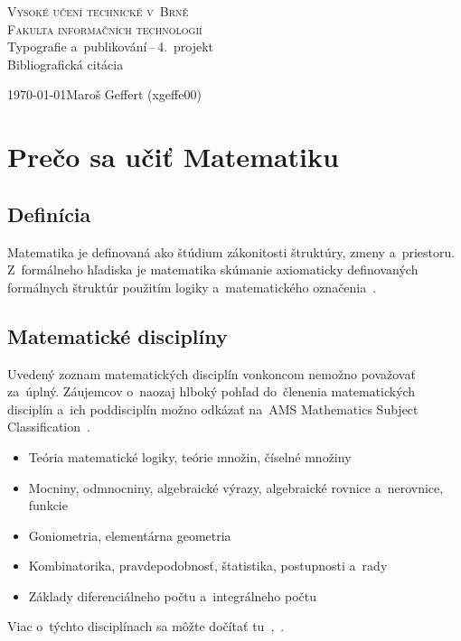 \documentclass[a4paper, 11pt]{article}
\begin{document}
    \begin{titlepage}
        \begin{center}
            {\Huge \textsc{Vysoké učení technické v~Brně}} \\
            {\huge \textsc
                {Fakulta informačních technologií}}\\
            
            \LARGE
            {Typografie a~publikování\,--\,4.~projekt} \\
            \Huge{
            Bibliografická citácia}\\
        \end{center}
    
        {\Large {\today \hfill Maroš Geffert (xgeffe00)}}
    \end{titlepage}

\section{Prečo sa učiť Matematiku}

\subsection{Definícia}
Matematika je definovaná ako štúdium zákonitosti štruktúry, zmeny a~priestoru. Z~formálneho hľadiska je matematika skúmanie axiomaticky definovaných formálnych štruktúr použitím logiky a~matematického označenia~\cite{kuvrina2011matematika}.

\subsection{Matematické disciplíny}
Uvedený zoznam matematických disciplín vonkoncom nemožno považovať za~úplný. Záujemcov o~naozaj hlboký pohľad do~členenia matematických disciplín a~ich poddisciplín možno odkázať na~AMS Mathematics Subject Classification~\cite{landau1987moments}.
\begin{itemize}
		\item Teória matematické logiky, teórie množin, číselné množiny
		\item Mocniny, odmnocniny, algebraické výrazy, algebraické rovnice a~nerovnice, funkcie
		\item Goniometria, elementárna geometria
		\item Kombinatorika, pravdepodobnosť, štatistika, postupnosti a~rady
		\item Základy diferenciálneho počtu a~integrálneho počtu
\end{itemize}
Viac o~týchto disciplínach sa môžte dočítať tu~\cite{keilova2016uvod},~\cite{kolavr2014elektronicka}.
\end{document}
